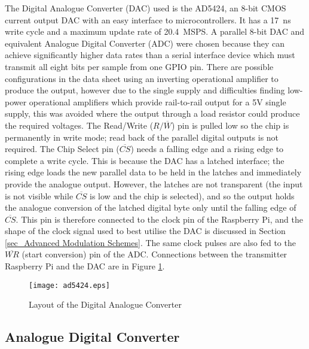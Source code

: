 \documentclass[../main.tex]{subfiles}
\begin{document}
The Digital Analogue Converter (DAC) used is the AD5424, an 8-bit CMOS current output DAC with an easy interface to microcontrollers.
It has a \SI{17}{\nano\second} write cycle and a maximum update rate of \SI{20.4}{MSPS}. %
A parallel 8-bit DAC and equivalent Analogue Digital Converter (ADC) were chosen because they can achieve significantly higher data rates than a serial interface device which must transmit all eight bits per sample from one GPIO pin.
There are possible configurations in the data sheet using an inverting operational amplifier to produce the output, however due to the single supply and difficulties finding low-power operational amplifiers which provide rail-to-rail output for a 5V single supply, this was avoided where the output through a load resistor could produce the required voltages.
The Read/Write ($R/\overline{W}$) pin is pulled low so the chip is permanently in write mode; read back of the parallel digital outputs is not required.
The Chip Select pin ($\overline{CS}$) needs a falling edge and a rising edge to complete a write cycle.
This is because the DAC has a latched interface; the rising edge loads the new parallel data to be held in the latches and immediately provide the analogue output.
However, the latches are not transparent (the input is not visible while $\overline{CS}$ is low and the chip is selected), and so the output holds the analogue conversion of the latched digital byte only until the falling edge of $\overline{CS}$.
This pin is therefore connected to the clock pin of the Raspberry Pi, and the shape of the clock signal used to best utilise the DAC is discussed in Section \ref{sec_Advanced Modulation Schemes}.
The same clock pulses are also fed to the $\overline{WR}$ (start conversion) pin of the ADC.
Connections between the transmitter Raspberry Pi and the DAC are in Figure \ref{fig_DAC Layout}.\\

\begin{figure}[ht]
	\centering
	\texttt{[image: ad5424.eps]}
	\caption{Layout of the Digital Analogue Converter}
	\label{fig_DAC Layout}
\end{figure}

\subsection{Analogue Digital Converter}
\end{document}
